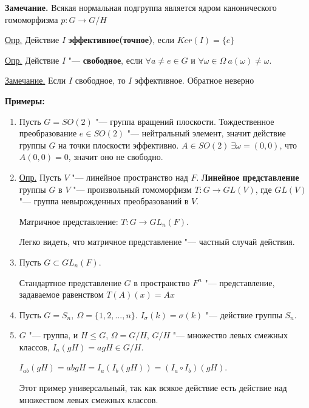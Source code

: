 \documentclass{article}
\begin{document}
\vspace{5pt}

\textbf{Замечание.} Всякая нормальная подгруппа является ядром канонического гомоморфизма $p: G \rightarrow G/H$

\vspace{5pt}

\underline{Опр.} Действие $I$ \textbf{эффективное(точное)}, если $Ker(I) = \{e\}$

\vspace{5pt}


\underline{Опр.} Действие $I$ "--- \textbf{свободное}, если $\forall a \neq e \in G$ и $\forall \omega \in \Omega \  a(\omega) \neq \omega$.

\vspace{5pt}

\underline{Замечание.} Если $I$ свободное, то $I$ эффективное. Обратное неверно

\vspace{5pt}

\textbf{Примеры:}
\begin{enumerate}
	\item Пусть $G = SO(2)$ "--- группа вращений плоскости. Тождественное преобразование $e \in SO(2)$ "--- нейтральный элемент, значит действие группы $G$ на точки плоскости эффективно. $A \in SO(2) \  \exists \omega = (0, 0)$, что $A(0, 0) = 0$, значит оно не свободно.

	\item \underline{Опр.} Пусть $V$ "--- линейное пространство над $F$. \textbf{Линейное представление} группы $G$ в $V$ "--- произвольный гомоморфизм $T: G \rightarrow GL(V)$, где $GL(V)$ "--- группа невырожденных преобразований в $V$.

Матричное представление: $T: G \rightarrow GL_n(F)$.

Легко видеть, что матричное представление "--- частный случай действия.
	
	\item Пусть $G \subset GL_n(F)$.
	
	Стандартное представление $G$ в пространство $F^n$ "--- представление, задаваемое равенством $T(A)(x) = Ax$
	\item Пусть $G = S_n, \  \Omega = \{1, 2, ..., n\}$. $I_{\sigma}(k) = \sigma(k)$ "--- действие группы $S_n$.
	\item $G$ "--- группа, и $H \leq G$, $\Omega = G/H$, $G/H$ "--- множество левых смежных классов, $I_a(gH) = agH \in G/H$.
	
	$I_{ab}(gH) = abgH = I_a(I_b(gH)) = (I_a \circ I_b)(gH)$.
	
	Этот пример универсальный, так как всякое действие есть действие над множеством левых смежных классов.
\end{enumerate} 
\end{document}
